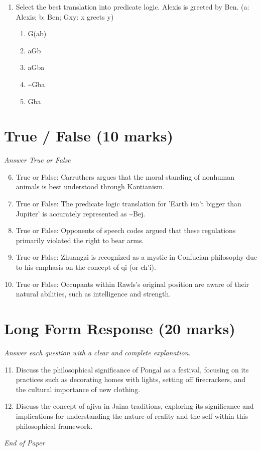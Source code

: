 \documentclass[12pt]{article}
\begin{document}
\begin{enumerate}[label=\arabic*.]
\begin{enumerate}[label=(\alph*)]
    \item both a and c.
    \item neither operation nor pleasure exist for their own sake.
\end{enumerate}
\item Select the best translation into predicate logic. Alexis is greeted by Ben. (a: Alexis; b: Ben; Gxy: x greets y)
\begin{enumerate}[label=(\alph*)]
    \item G(ab)
    \item aGb
    \item aGba
    \item \textasciitilde{}Gba
    \item Gba
\end{enumerate}
\end{enumerate}

\section*{True / False (10 marks)}
\textit{Answer True or False}
\begin{enumerate}[label=\arabic*.]
\setcounter{enumi}{5}
\item True or False: Carruthers argues that the moral standing of nonhuman animals is best understood through Kantianism.
\item True or False: The predicate logic translation for 'Earth isn't bigger than Jupiter' is accurately represented as \textasciitilde{}Bej.
\item True or False: Opponents of speech codes argued that these regulations primarily violated the right to bear arms.
\item True or False: Zhuangzi is recognized as a mystic in Confucian philosophy due to his emphasis on the concept of qi (or ch'i).
\item True or False: Occupants within Rawls's original position are aware of their natural abilities, such as intelligence and strength.
\end{enumerate}

\section*{Long Form Response (20 marks)}
\textit{Answer each question with a clear and complete explanation.}
\begin{enumerate}[label=\arabic*.]
\setcounter{enumi}{10}
\item Discuss the philosophical significance of Pongal as a festival, focusing on its practices such as decorating homes with lights, setting off firecrackers, and the cultural importance of new clothing.
\item Discuss the concept of ajiva in Jaina traditions, exploring its significance and implications for understanding the nature of reality and the self within this philosophical framework.
\end{enumerate}

\vfill
\noindent\textit{End of Paper}
\end{document}
